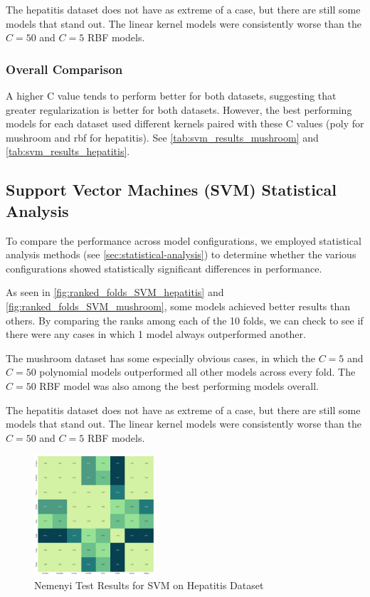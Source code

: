 The hepatitis dataset does not have as extreme of a case, but there are still some models that stand out.
The linear kernel models were consistently worse than the $C=50$ and $C=5$ RBF models.

\subsubsection*{Overall Comparison}
A higher C value tends to perform better for both datasets, suggesting that greater regularization is better for both datasets.
However, the best performing models for each dataset used different kernels paired with these C values
(poly for mushroom and rbf for hepatitis). See \autoref{tab:svm_results_mushroom} and \autoref{tab:svm_results_hepatitis}.

\subsection*{Support Vector Machines (SVM) Statistical Analysis}
To compare the performance across model configurations, we employed statistical analysis methods
(see \autoref{sec:statistical-analysis}) to determine whether the various configurations showed
statistically significant differences in performance.

As seen in \autoref{fig:ranked_folds_SVM_hepatitis} and \autoref{fig:ranked_folds_SVM_mushroom},
some models achieved better results than others. By comparing the ranks among each of the 10 folds,
we can check to see if there were any cases in which 1 model always outperformed another.

The mushroom dataset has some especially obvious cases, in which the $C=5$ and $C=50$ polynomial models
outperformed all other models across every fold. The $C=50$ RBF model was also among the best performing models overall.

The hepatitis dataset does not have as extreme of a case, but there are still some models that stand out.
The linear kernel models were consistently worse than the $C=50$ and $C=5$ RBF models.

\begin{figure}
    \centering
    \includegraphics[width=0.4\textwidth]{figures/nemenyi_test_results_SVM_hepatitis.png}
    \caption{Nemenyi Test Results for SVM on Hepatitis Dataset}
    \label{fig:nemenyi_test_results_SVM_hepatitis}
\end{figure}

